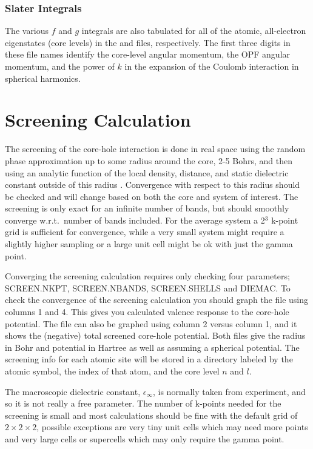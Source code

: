 \documentclass[11pt]{report}
\begin{document}
\subsection{Slater Integrals}
The various $f$ and $g$ integrals are also tabulated for all of the atomic, all-electron eigenstates (core levels) in the  and  files, respectively. The first three digits in these file names identify the core-level angular momentum, the OPF angular momentum, and the power of $k$ in the expansion of the Coulomb interaction in spherical harmonics. 

\chapter{Screening Calculation}
\label{screening}

The screening of the core-hole interaction is done in real space using the random phase approximation up to 
some radius around the core, 2-5 Bohrs, and then using an analytic function of the local density, distance, 
and static dielectric constant outside of this radius \cite{Shirley2006986}. Convergence with respect to this radius should be 
checked and will change based on both the core and system of interest. The screening is only exact for an 
infinite number of bands, but should smoothly converge w.r.t.\ number of bands included. For the average 
system a 2$^3$ k-point grid is sufficient for convergence, while a very small system might require a 
slightly higher sampling or a large unit cell might be ok with just the gamma point.

Converging the screening calculation requires only checking four parameters; SCREEN.NKPT, SCREEN.NBANDS, SCREEN.SHELLS and DIEMAC. To check the convergence of the screening calculation you should graph the file  using columns 1 and 4. This gives you calculated valence response to the core-hole potential. The file  can also be graphed using column 2 versus column 1, and it shows the (negative) total screened core-hole potential. Both files give the radius in Bohr and potential in Hartree as well as assuming a spherical potential. The screening info for each atomic site will be stored in a directory labeled by the atomic symbol, the index of that atom, and the core level $n$ and $l$.

The macroscopic dielectric constant, $\epsilon_\infty$, is normally taken from experiment, and so it is not really a free parameter. The number of k-points needed for the screening is small and most calculations should be fine with the default grid of $2\times2\times2$, possible exceptions are very tiny unit cells which may need more points and very large cells or supercells which may only require the gamma point. 
\end{document}
